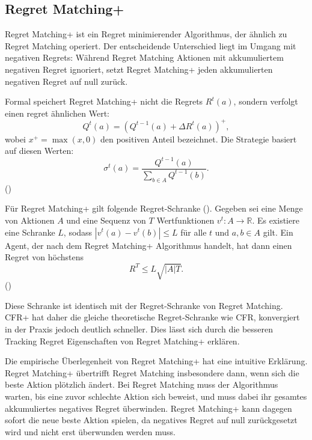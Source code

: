 \subsection{Regret Matching+}

Regret Matching+ ist ein Regret minimierender Algorithmus, der ähnlich zu Regret Matching operiert.
Der entscheidende Unterschied liegt im Umgang mit negativen Regrets: Während Regret Matching Aktionen mit akkumuliertem negativen Regret ignoriert, setzt Regret Matching+ jeden akkumulierten negativen Regret auf null zurück.

Formal speichert Regret Matching+ nicht die Regrets $R^t(a)$, sondern verfolgt einen regret ähnlichen Wert:
\begin{equation}
Q^t(a) = \left(Q^{t-1}(a) + \Delta R^t(a)\right)^+,
\end{equation}
wobei $x^+ = \max(x, 0)$ den positiven Anteil bezeichnet.
Die Strategie basiert auf diesen Werten:
\begin{equation}
\sigma^t(a) = \frac{Q^{t-1}(a)}{\sum_{b \in A} Q^{t-1}(b)}.
\end{equation}
(\cite{tammelin2015solving})

Für Regret Matching+ gilt folgende Regret-Schranke (\cite[Thm.~1]{tammelin2015solving}).
Gegeben sei eine Menge von Aktionen $A$ und eine Sequenz von $T$ Wertfunktionen $v^t : A \to \mathbb{R}$.
Es existiere eine Schranke $L$, sodass $|v^t(a) - v^t(b)| \le L$ für alle $t$ und $a, b \in A$ gilt.
Ein Agent, der nach dem Regret Matching+ Algorithmus handelt, hat dann einen Regret von höchstens
\begin{equation}
R^T \le L\sqrt{|A|T}.
\end{equation}
(\cite[Thm.~1]{tammelin2015solving})

Diese Schranke ist identisch mit der Regret-Schranke von Regret Matching.
CFR+ hat daher die gleiche theoretische Regret-Schranke wie CFR, konvergiert in der Praxis jedoch deutlich schneller.
Dies lässt sich durch die besseren Tracking Regret Eigenschaften von Regret Matching+ erklären.

Die empirische Überlegenheit von Regret Matching+ hat eine intuitive Erklärung.
Regret Matching+ übertrifft Regret Matching insbesondere dann, wenn sich die beste Aktion plötzlich ändert.
Bei Regret Matching muss der Algorithmus warten, bis eine zuvor schlechte Aktion sich beweist, und muss dabei ihr gesamtes akkumuliertes negatives Regret überwinden.
Regret Matching+ kann dagegen sofort die neue beste Aktion spielen, da negatives Regret auf null zurückgesetzt wird und nicht erst überwunden werden muss.